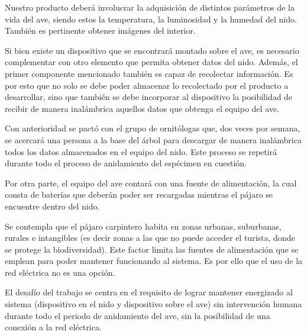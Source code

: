 Nuestro producto deberá involucrar la adquisición de distintos parámetros de la vida del ave, siendo estos la temperatura, la luminosidad y la humedad del nido. También es pertinente obtener imágenes del interior. 

Si bien existe un dispositivo que se encontrará montado sobre el ave, es necesario complementar con otro elemento que permita obtener datos del nido. Además, el primer componente mencionado también es capaz de recolectar información. Es por esto que no solo se debe poder almacenar lo recolectado por el producto a desarrollar, sino que también se debe incorporar al dispositivo la posibilidad de recibir de manera inalámbrica aquellos datos que obtenga el equipo del ave. 

Con anterioridad se pactó con el grupo de ornitólogas que, dos veces por semana, se acercará una persona a la base del árbol para descargar de manera inalámbrica todos los datos almacenados en el equipo del nido. Este proceso se repetirá durante todo el proceso de anidamiento del espécimen en cuestión.

Por otra parte, el equipo del ave contará con una fuente de alimentación, la cual consta de baterías que deberán poder ser recargadas mientras el pájaro se encuentre dentro del nido.

Se contempla que el pájaro carpintero habita en zonas urbanas, suburbanas, rurales e intangibles (es decir zonas a las que no puede acceder el turista, donde se protege la biodiversidad). Este factor limita las fuentes de alimentación que se emplean para poder mantener funcionando al sistema. Es por ello que el uso de la red eléctrica no es una opción.

El desafío del trabajo se centra en el requisito de lograr mantener energizado al sistema (dispositivo en el nido y dispositivo sobre el ave) sin intervención humana durante todo el periodo de anidamiento del ave, sin la posibilidad de una conexión a la red eléctrica.
